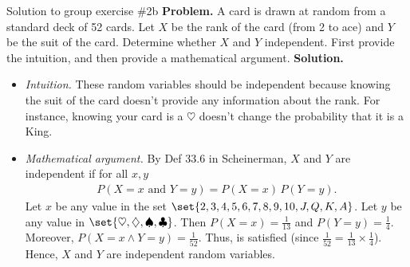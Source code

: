 \documentclass[10pt]{beamer}
\begin{document}
\begin{frame}{Solution to group exercise \#2b}
\small
\textbf{Problem.} A card is drawn at random from a standard deck of 52 cards. Let $X$ be the rank of the card (from 2 to ace) and $Y$ be the suit of the card. Determine whether $X$ and $Y$ independent. First provide the intuition, and then provide a mathematical argument.  
\vfill 
\vspace{-.2cm}
\textbf{Solution.}
\vspace{-.2cm}
\begin{itemize}
\item \textit{Intuition.} These random variables should be independent because knowing the suit of the card doesn't provide any information about the rank.  For instance, knowing your card is a $\heartsuit$ doesn't change the probability that it is a King.
\vfill 
\item \textit{Mathematical argument.} By Def 33.6 in Scheinerman, $X$ and $Y$ are independent if for all $x,y$
%
\begin{align}
P(X=x \text{ and } Y=y) = P(X=x) \, P(Y=y).
\label{eqn:def_independence}
\end{align}
%
Let $x$ be any value in the set $\set{2,3,4,5,6,7,8,9,10,J,Q,K,A}$.  Let $y$ be any value in $\set{\heartsuit, \diamondsuit, \spadesuit, \clubsuit}$. Then $P(X=x) = \frac{1}{13}$ and $P(Y=y) = \frac{1}{4}$.   Moreover, $P(X=x \land Y=y) = \frac{1}{52}.$  Thus,  is satisfied (since $\frac{1}{52} = 	\frac{1}{13} \times \frac{1}{4}$).   Hence, $X$ and $Y$ are independent random variables.
\end{itemize}

\end{frame}
\end{document}
